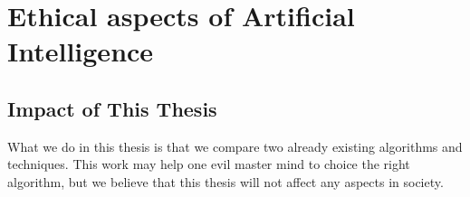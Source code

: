 \section{Ethical aspects of Artificial Intelligence }



\subsection{Impact of This Thesis }
What we do in this thesis is that we compare two already existing algorithms and techniques. This work may help one evil master mind to choice the right algorithm, but we believe that this thesis will not affect any  aspects in society. 





